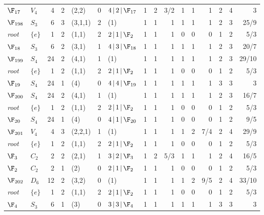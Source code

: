 \begin{landscape}
{\begin{longtable}{@{}l l r r l r l rrr rrr rrr@{}}
\quad$\F_{17}$ & $V_{4}$ & 4 & 2 & (2,2) & 0 & $4\,|\,2\,|\,\F_{17}$ & 1 & 2 & 3/2 & 1 & 1 & 1 & 2 & 4 & 3 \\
\addlinespace[3pt]
\textbf{$\F_{198}$} & $S_{3}$ & 6 & 3 & (3,1,1) & 2 & (1) & 1 & 1 & 1 & 1 & 1 & 1 & 2 & 3 & 25/9 \\
\quad\textit{root} & $\{e\}$ & 1 & 2 & (1,1) & 2 & $2\,|\,1\,|\,\F_{2}$ & 1 & 1 & 1 & 0 & 0 & 0 & 1 & 2 & 5/3 \\
\quad$\F_{18}$ & $S_{3}$ & 6 & 2 & (3,1) & 1 & $4\,|\,3\,|\,\F_{18}$ & 1 & 1 & 1 & 1 & 1 & 1 & 2 & 3 & 20/7 \\
\addlinespace[3pt]
\textbf{$\F_{199}$} & $S_{4}$ & 24 & 2 & (4,1) & 1 & (1) & 1 & 1 & 1 & 1 & 1 & 1 & 2 & 3 & 29/10 \\
\quad\textit{root} & $\{e\}$ & 1 & 2 & (1,1) & 2 & $2\,|\,1\,|\,\F_{2}$ & 1 & 1 & 1 & 0 & 0 & 0 & 1 & 2 & 5/3 \\
\quad$\F_{19}$ & $S_{4}$ & 24 & 1 & (4) & 0 & $4\,|\,4\,|\,\F_{19}$ & 1 & 1 & 1 & 1 & 1 & 1 & 3 & 3 & 3 \\
\addlinespace[3pt]
\textbf{$\F_{200}$} & $S_{4}$ & 24 & 2 & (4,1) & 1 & (1) & 1 & 1 & 1 & 1 & 1 & 1 & 2 & 3 & 16/7 \\
\quad\textit{root} & $\{e\}$ & 1 & 2 & (1,1) & 2 & $2\,|\,1\,|\,\F_{2}$ & 1 & 1 & 1 & 0 & 0 & 0 & 1 & 2 & 5/3 \\
\quad$\F_{20}$ & $S_{4}$ & 24 & 1 & (4) & 0 & $4\,|\,1\,|\,\F_{20}$ & 1 & 1 & 1 & 0 & 0 & 0 & 1 & 2 & 9/5 \\
\addlinespace[3pt]
\textbf{$\F_{201}$} & $V_{4}$ & 4 & 3 & (2,2,1) & 1 & (1) & 1 & 1 & 1 & 1 & 2 & 7/4 & 2 & 4 & 29/9 \\
\quad\textit{root} & $\{e\}$ & 1 & 2 & (1,1) & 2 & $2\,|\,1\,|\,\F_{2}$ & 1 & 1 & 1 & 0 & 0 & 0 & 1 & 2 & 5/3 \\
\quad$\F_{3}$ & $C_{2}$ & 2 & 2 & (2,1) & 1 & $3\,|\,2\,|\,\F_{3}$ & 1 & 2 & 5/3 & 1 & 1 & 1 & 2 & 4 & 16/5 \\
\quad$\F_{2}$ & $C_{2}$ & 2 & 1 & (2) & 0 & $2\,|\,1\,|\,\F_{2}$ & 1 & 1 & 1 & 0 & 0 & 0 & 1 & 2 & 5/3 \\
\addlinespace[3pt]
\textbf{$\F_{202}$} & $D_{6}$ & 12 & 2 & (3,2) & 0 & (1) & 1 & 1 & 1 & 1 & 2 & 9/5 & 2 & 4 & 33/10 \\
\quad\textit{root} & $\{e\}$ & 1 & 2 & (1,1) & 2 & $2\,|\,1\,|\,\F_{2}$ & 1 & 1 & 1 & 0 & 0 & 0 & 1 & 2 & 5/3 \\
\quad$\F_{4}$ & $S_{3}$ & 6 & 1 & (3) & 0 & $3\,|\,3\,|\,\F_{4}$ & 1 & 1 & 1 & 1 & 1 & 1 & 3 & 3 & 3 \\

\end{longtable}}
\end{landscape}

